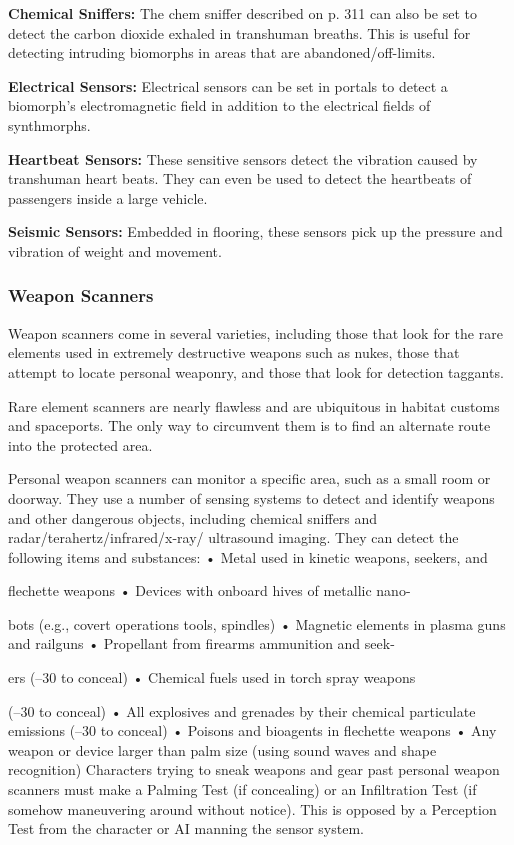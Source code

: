 \textbf{Chemical Sniffers:} The chem sniffer described on 
p. 311 can also be set to detect the carbon dioxide 
exhaled in transhuman breaths. This is useful for 
detecting intruding biomorphs in areas that are 
abandoned/off-limits.

\textbf{Electrical Sensors:} Electrical sensors can be set in 
portals to detect a biomorph's electromagnetic field 
in addition to the electrical fields of synthmorphs.

\textbf{Heartbeat Sensors:} These sensitive sensors detect 
the vibration caused by transhuman heart beats. 
They can even be used to detect the heartbeats of 
passengers inside a large vehicle.

\textbf{Seismic Sensors:} Embedded in flooring, these sensors
pick up the pressure and vibration of weight
and movement.

\subsubsection{Weapon Scanners}

Weapon scanners come in several varieties, including
those that look for the rare elements used in
extremely destructive weapons such as nukes, those 
that attempt to locate personal weaponry, and those 
that look for detection taggants.

Rare element scanners are nearly flawless and are 
ubiquitous in habitat customs and spaceports. The 
only way to circumvent them is to find an alternate 
route into the protected area.

Personal weapon scanners can monitor a specific 
area, such as a small room or doorway. They use 
a number of sensing systems to detect and identify 
weapons and other dangerous objects, including 
chemical sniffers and radar/terahertz/infrared/x-ray/
ultrasound imaging. They can detect the following 
items and substances:
•  Metal used in kinetic weapons, seekers, and 

flechette weapons
•  Devices with onboard hives of metallic nano-

bots (e.g., covert operations tools, spindles)
•  Magnetic elements in plasma guns and railguns
•  Propellant from firearms ammunition and seek-

ers (–30 to conceal)
•  Chemical fuels used in torch spray weapons 

(–30 to conceal)
•  All explosives and grenades by their chemical 
particulate emissions (–30 to conceal)
•  Poisons and bioagents in flechette weapons
•  Any weapon or device larger than palm size 
(using sound waves and shape recognition)
Characters trying to sneak weapons and gear past 
personal weapon scanners must make a Palming
Test (if concealing) or an Infiltration
Test (if somehow maneuvering around 
without notice). This is opposed by a 
Perception Test from the character or 
AI manning the sensor system.

